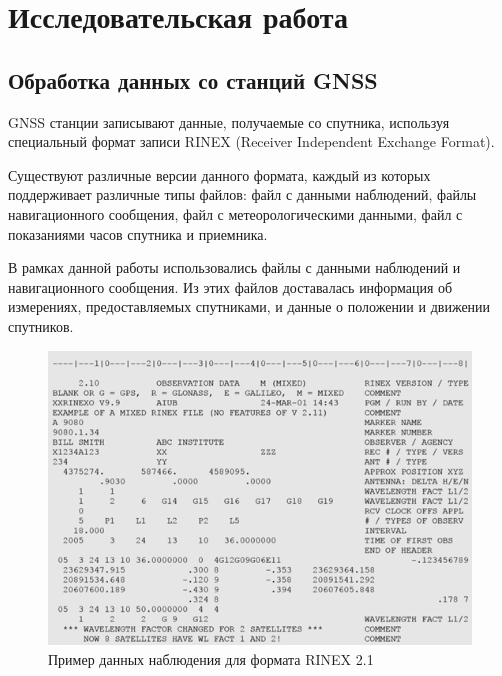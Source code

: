 \documentclass[a4paper]{article}
\begin{document}
\newpage
\section{Исследовательская работа}
\subsection{Обработка данных со станций GNSS}
 GNSS станции записывают данные, получаемые со спутника, используя специальный формат записи RINEX (Receiver Independent Exchange Format).
 
 Существуют различные версии данного формата, каждый из которых поддерживает различные типы файлов: файл с данными наблюдений, файлы навигационного сообщения, файл с метеорологическими данными, файл с показаниями часов спутника и приемника.
 
 В рамках данной работы использовались файлы с данными наблюдений и навигационного сообщения. Из этих файлов доставалась информация об измерениях, предоставляемых спутниками, и данные о положении и движении спутников.
  
\begin{figure}[h!]
\centering
\includegraphics[width = 1\linewidth]{pics/rinex_obs.png}
\caption{Пример данных наблюдения для формата RINEX 2.1}
\end{figure}
\end{document}
